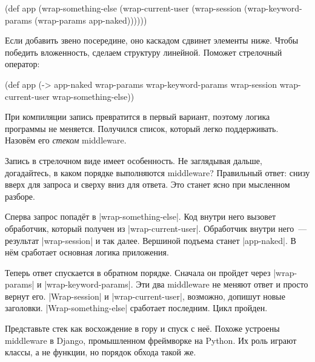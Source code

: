 \begin{english}
  \begin{clojure}
(def app
  (wrap-something-else
    (wrap-current-user
      (wrap-session
        (wrap-keyword-params
          (wrap-params app-naked))))))
  \end{clojure}
\end{english}


Если добавить звено посередине, оно каскадом сдвинет элементы ниже. Чтобы
победить вложенность, сделаем структуру линейной. Поможет стрелочный оператор:


\begin{english}
  \begin{clojure/lines}
(def app
  (-> app-naked
      wrap-params
      wrap-keyword-params
      wrap-session
      wrap-current-user
      wrap-something-else))
  \end{clojure/lines}
\end{english}


При компиляции запись превратится в первый вариант, поэтому логика программы не
меняется. Получился список, который легко поддерживать. Назов\"{е}м его
\emph{стеком} middleware.

Запись в стрелочном виде имеет особенность. Не заглядывая дальше, догадайтесь, в
каком порядке выполняются middleware? Правильный ответ: снизу вверх для запроса
и сверху вниз для ответа. Это станет ясно при мысленном разборе.


Сперва запрос попад\"{е}т в \spverb|wrap-something-else|. Код внутри него
вызовет обработчик, который получен из \spverb|wrap-current-user|. Обработчик
внутри него~--- результат \spverb|wrap-session| и так далее. Вершиной подъема
станет \spverb|app-naked|. В н\"{е}м сработает основная логика приложения.

Теперь ответ спускается в обратном порядке. Сначала он пройдет через
\spverb|wrap-params| и \spverb|wrap-keyword-params|. Эти два middleware не
меняют ответ и просто вернут его. \spverb|Wrap-session| и
\spverb|wrap-current-user|, возможно, допишут новые заголовки.
\spverb|Wrap-something-else| сработает последним. Цикл пройден.


Представьте стек как восхождение в гору и спуск с не\"{е}. Похоже устроены
middleware в Django, промышленном фреймворке на Python. Их роль играют классы, а
не функции, но порядок обхода такой же.

